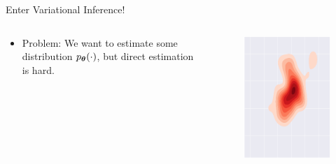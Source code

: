\documentclass{beamer}
\begin{document}
\begin{frame}{Enter Variational Inference!}
    \begin{columns}[T]
        \begin{column}{.7\textwidth}
            \begin{itemize}
                \item {
                    Problem: We want to estimate some distribution $p_{\boldsymbol{\theta}}(\cdot)$, but direct estimation is hard.
                }
            \end{itemize}
        \end{column}
        \begin{column}{.3\textwidth}
            \begin{figure}
                \centering
                \includegraphics[width=\textwidth]{dist1}
            \end{figure}
        \end{column}
    \end{columns}
\end{frame}
\end{document}
